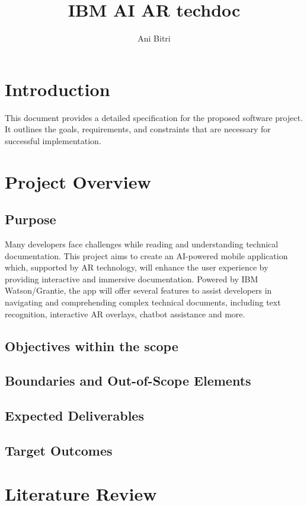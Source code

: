 \documentclass[12pt]{article}
\title{IBM AI AR techdoc}
\author{Ani Bitri}
\begin{document}
\maketitle

\tableofcontents
\newpage

\section{Introduction}
This document provides a detailed specification for the proposed software project. It outlines the goals, requirements, and constraints that are necessary for successful implementation.

\section{Project Overview}
\subsection{Purpose}
Many developers face challenges while reading and understanding technical documentation. This project aims to create an AI-powered mobile application which, supported by AR technology, will enhance the user experience
by providing interactive and immersive documentation. Powered by IBM Watson/Grantie, the app will offer several features to assist developers in navigating and comprehending complex technical documents, including text recognition,
interactive AR overlays, chatbot assistance and more.

\subsection{Objectives within the scope}

\subsection{Boundaries and Out-of-Scope Elements}

\subsection{Expected Deliverables}

\subsection{Target Outcomes}

\section{Literature Review}
\end{document}
